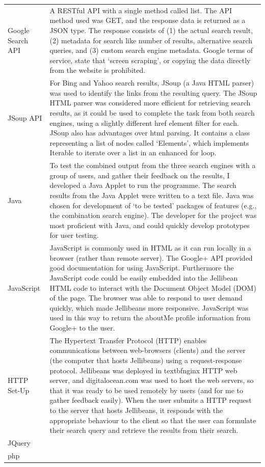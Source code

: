 \documentclass[a4paper, 11pt]{article}
\begin{document}
\begin{tabular}{l p{11cm} }
Google Search API & A RESTful API with a single method called list. The API method used was GET, and the response data is returned as a JSON type. The response consists of (1) the actual search result, (2) metadata for search like number of results, alternative search queries, and (3) custom search engine metadata. Google terms of service, state that `screen scraping', or copying the data directly from the website is prohibited.\\
JSoup API & For Bing and Yahoo search results, JSoup (a Java HTML parser) was used to identify the links from the resulting query. The JSoup HTML parser was considered more efficient for retrieving search results, as it could be used to complete the task from both search engines, using a slightly different href element filter for each. JSoup also has advantages over html parsing. It contains a class representing a list of nodes called `Elements', which implements Iterable to iterate over a list in an enhanced for loop.\\
Java & To test the combined output from the three search engines with a group of users, and gather their feedback on the results, I developed a Java Applet to run the programme. The search results from the Java Applet were written to a text file. Java was chosen for development of `to be tested' packages of features (e.g., the combination search engine). The developer for the project was most proficient with Java, and could quickly develop prototypes for user testing.\\
JavaScript & JavaScript is commonly used in HTML as it can run locally in a browser (rather than remote server). The Google+ API provided good documentation for using JavaScript. Furthermore the JavaScript code could be easily embedded into the Jellibean HTML code to interact with the Document Object Model (DOM) of the page. The browser was able to respond to user demand quickly, which made Jellibeans more responsive. JavaScript was used in this way to return the aboutMe profile information from Google+ to the user.\\
HTTP Set-Up & The Hypertext Transfer Protocol (HTTP) enables communications between web-browsers (clients) and the server (the computer that hosts Jellibeans) using a request-response protocol. Jellibeans was deployed in textbf{nginx} HTTP web server, and digitalocean.com was used to host the web servers, so that it was ready to be used remotely by users (and for me to gather feedback easily). When the user submits a HTTP request to the server that hosts Jellibeans, it responds with the appropriate behaviour to the client so that the user can formulate their search query and retrieve the results from their search. \\
JQuery & \\
php & \\

\end{tabular}
\end{document}
